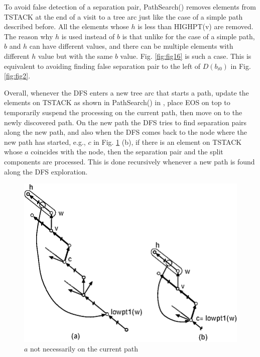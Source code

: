 \documentclass[twoside,twocolumn]{article}
\begin{document}
To avoid false detection of a separation pair, {\ttfamily PathSearch()} removes elements from {\ttfamily TSTACK} at the end of a visit
to a tree arc just like the case of a simple path described before.
All the elements whose $h$ is less than {\ttfamily HIGHPT(v)} are removed. The reason why $h$ is used instead of $b$ is that
unlike for the case of a simple path, $b$ and $h$ can have different values, and there can be multiple elements
with different $h$ value but with the same $b$ value. Fig. \ref{fig:fig16} is such a case.
This is equivalent to avoiding finding false separation pair to the left of $D(b_{i0})$ in Fig. \ref{fig:fig2}.

Overall, whenever the DFS enters a new tree arc that starts a path, update the elements on {\ttfamily TSTACK} as shown in {\ttfamily PathSearch()}
in \cite{GM01}, place {\ttfamily EOS} on top to temporarily suspend the processing on the current path, then move on to the newly discovered path.
On the new path the DFS tries to find separation pairs along the new path, and also when the DFS comes back to the node where the new path has started, e.g., $c$ in Fig. \ref{fig:fig15} (b), if there is an element on TSTACK whose $a$ coincides with the node, then the separation pair and the split components are processed. This is done recursively whenever a new path is found along the DFS exploration.

\begin{figure}[!htb]
\centering
\includegraphics[scale=0.7]{spqr_fig15.eps}
\caption{$a$ not necessarily on the current path}
\label{fig:fig15}
\end{figure}
\end{document}
